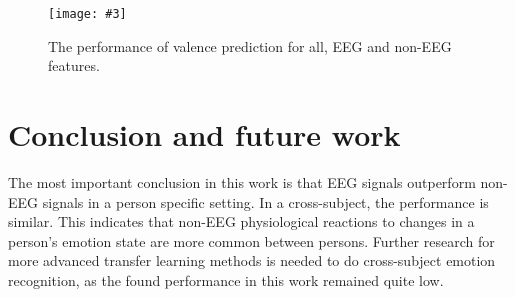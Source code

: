 \documentclass[12pt,journal,compsoc]{IEEEtran}
\newcommand{\mijnfiguur}[4][H]{            %
    \begin{figure}[#1]                      %
        \begin{center}                      %
            \texttt{[image: \#3]}        %
            \caption{#4\label{#3}}          %
        \end{center}
    \end{figure}
    }
\begin{document}
\mijnfiguur{width=.5\textwidth}{valencephyeegall_gen}{The performance of valence prediction for all, EEG and non-EEG features.}

\section{Conclusion and future work} \label{conclusion}
The most important conclusion in this work is that EEG signals outperform non-EEG signals in a person specific setting. In a cross-subject, the performance is similar. This indicates that non-EEG physiological reactions to changes in a person's emotion state are more common between persons. Further research for more advanced transfer learning methods is needed to do cross-subject emotion recognition, as the found performance in this work remained quite low.



\end{document}
